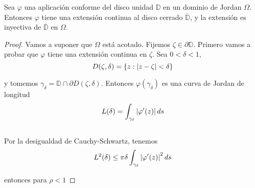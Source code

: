 \bigskip

\begin{theorem}
    Sea $\varphi$ una aplicación conforme del disco unidad $\mathbb{D}$ en un dominio de Jordan $\Omega$. Entonces $\varphi$ tiene una extensión continua al disco cerrado $\overline{\mathbb{D}}$, y la extensión es inyectiva de $\overline{\mathbb{D}}$ en $\Omega$.
\end{theorem}

\begin{proof}
    Vamos a suponer que $\Omega$ está acotado. Fijemos $\zeta \in \partial \mathbb{D}$. Primero vamos a probar que $\varphi$ tiene una extensión continua en $\zeta$. Sea $0 < \delta < 1$,
    \begin{equation*}
        D(\zeta, \delta) = \{z: \left\lvert z - \zeta\right\rvert < \delta \}
    \end{equation*}

    y tomemos $\gamma_{\delta} = \mathbb{D} \cap \partial D(\zeta, \delta)$. Entonces $\varphi (\gamma_{\delta})$ es una curva de Jordan de longitud
    \begin{equation*}
        L(\delta) = \int_{\gamma_{\delta}} \left\lvert\varphi ' (z)\right\rvert ds
    \end{equation*}
    \\
    Por la desigualdad de Cauchy-Schwartz, tenemos
    \begin{equation*}
        L^2(\delta) \leq \pi \delta \int_{\gamma_{\delta}} \left\lvert\varphi ' (z)\right\rvert^2 ds
    \end{equation*}

    entonces para $\rho < 1$


\end{proof}
